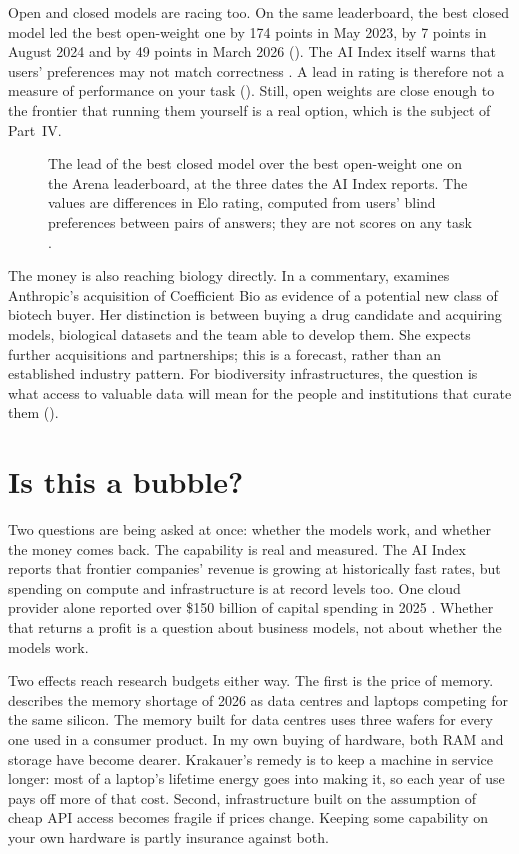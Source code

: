 Open and closed models are racing too. On the same leaderboard, the best closed
model led the best open-weight one by 174 points in May 2023, by 7 points in
August 2024 and by 49 points in March 2026 (). The AI Index
itself warns that users' preferences may not match correctness
\parencite{aiindex2026}. A lead in rating is therefore not a measure of
performance on your task (). Still, open weights are close
enough to the frontier that running them yourself is a real option, which is
the subject of Part~IV.

\begin{figure}[htbp]
\centering
{}
\caption{The lead of the best closed model over the best open-weight one on the
Arena leaderboard, at the three dates the AI Index reports. The values are
differences in Elo rating, computed from users' blind preferences between
pairs of answers; they are not scores on any task \parencite{aiindex2026}.}
\label{fig:gap}
\end{figure}

The money is also reaching biology directly. In a commentary,
\textcite{palermo2026acquirers} examines Anthropic's acquisition of Coefficient
Bio as evidence of a potential new class of biotech buyer. Her distinction is
between buying a drug candidate and acquiring models, biological datasets and
the team able to develop them. She expects further acquisitions and
partnerships; this is a forecast, rather than an established industry pattern.
For biodiversity infrastructures, the question is what access to valuable
data will mean for the people and institutions that curate them
().

\section{Is this a bubble?}

Two questions are being asked at once: whether the models work, and whether the
money comes back. The capability is real and measured. The AI Index reports
that frontier companies' revenue is growing at historically fast rates,
but spending on compute and infrastructure is at record levels too. One cloud
provider alone reported
over \$150 billion of capital spending in 2025
\parencite{aiindex2026}. Whether that returns a profit is a question about
business models, not about whether the models work.

Two effects reach research budgets either way. The first is the price of
memory. \textcite{krakauer2026dram} describes the memory shortage of 2026 as
data centres and laptops competing for the same silicon. The memory built for
data centres uses three wafers for every one used in a consumer product. In my
own buying of hardware, both RAM and storage have become dearer. Krakauer's
remedy is to keep a machine in service longer: most of a laptop's lifetime
energy goes into making it, so each year of use pays off more of that cost.
Second,
infrastructure built on the assumption of cheap API access becomes fragile if
prices change. Keeping some capability on
your own hardware is partly insurance against both.

